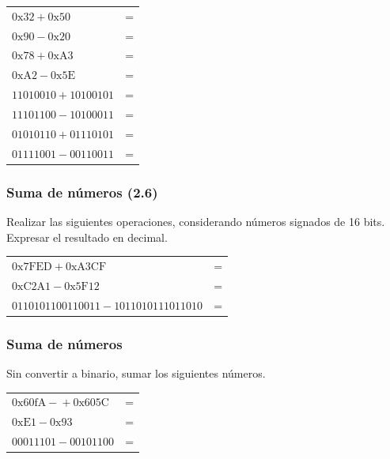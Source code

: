 \begin{tabular}{lc}
  $\mathrm{0x32} + \mathrm{0x50}$&=\underspace\\
  $\mathrm{0x90} - \mathrm{0x20}$&=\underspace\\
  $\mathrm{0x78} + \mathrm{0xA3}$&=\underspace\\
  $\mathrm{0xA2} - \mathrm{0x5E}$&=\underspace\\
  $\mathrm{11010010} + \mathrm{10100101}$&=\underspace\\
  $\mathrm{11101100} - \mathrm{10100011}$&=\underspace\\
  $\mathrm{01010110} + \mathrm{01110101}$&=\underspace\\
  $\mathrm{01111001} - \mathrm{00110011}$&=\underspace\\
\end{tabular}

\subsubsection{Suma de números (2.6)}
Realizar las siguientes operaciones, considerando números signados de 16 bits. Expresar el resultado en decimal.

\vspace{10mm}
\begin{tabular}{lc}
  $\mathrm{0x7FED} + \mathrm{0xA3CF}$&=\underspace\\
  $\mathrm{0xC2A1} - \mathrm{0x5F12}$&=\underspace\\
  $\mathrm{01101011 00110011} - \mathrm{10110101 11011010}$&=\underspace\\
\end{tabular}

\subsubsection{Suma de números}
Sin convertir a binario, sumar los siguientes números.

\begin{tabular}{lc}
  $\mathrm{0x60fA -} + \mathrm{0x605C} $&=\underspace\\
  $\mathrm{0xE1} - \mathrm{0x93}$&=\underspace\\
  $\mathrm{00011101} - \mathrm{00101100}$&=\underspace\\
\end{tabular}

